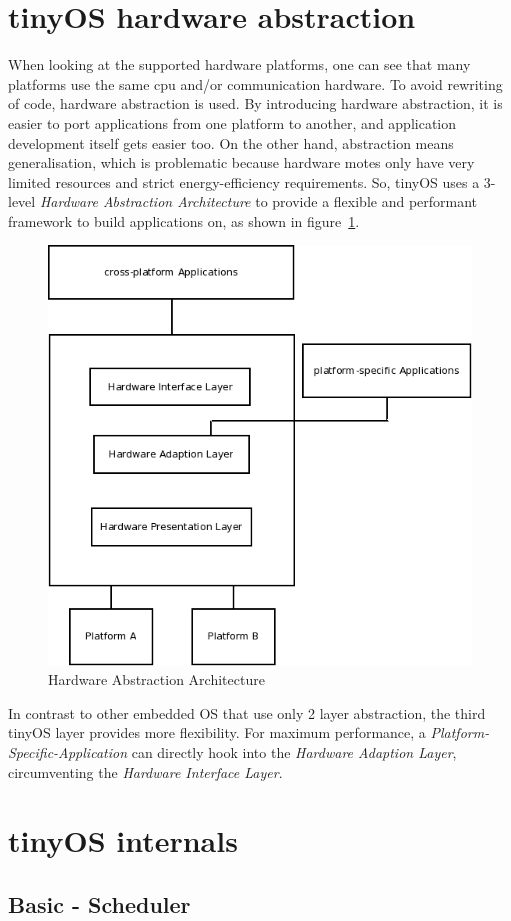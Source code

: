 \section{tinyOS hardware abstraction}

When looking at the supported hardware platforms, one can see that many platforms use the same cpu and/or communication hardware. To avoid rewriting of code, hardware abstraction is used.
By introducing hardware abstraction, it is easier to port applications from one platform to another, and application development itself gets easier too. On the other hand, abstraction means generalisation, which is problematic because hardware motes only have very limited resources and strict energy-efficiency requirements.
So, tinyOS uses a 3-level \textit{Hardware Abstraction Architecture} to provide a flexible and performant framework to build applications on, as shown in figure~\ref{fig:haa}.

\begin{figure}[h]
 \centerline{\includegraphics[width=.6\columnwidth]{pics/hardwareabstraction.png}}
  \caption{Hardware Abstraction Architecture}
  \label{fig:haa}
\end{figure}

In contrast to other embedded OS that use only 2 layer abstraction, the third tinyOS layer provides more flexibility. For maximum performance, a \textit{Platform-Specific-Application} can directly hook into the \textit{Hardware Adaption Layer}, circumventing the \textit{Hardware Interface Layer}.


\section{tinyOS internals}

\subsection{Basic - Scheduler}

